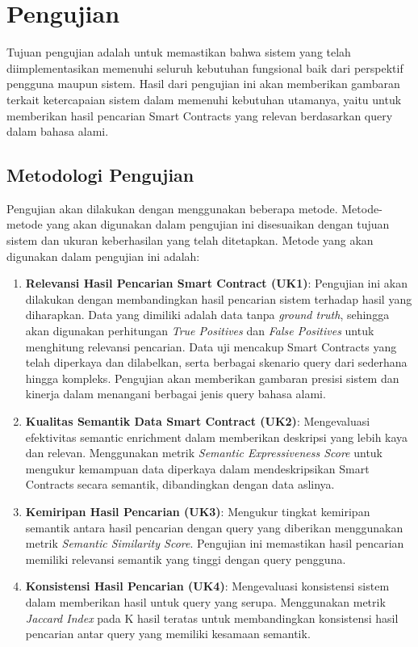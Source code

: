 \section{Pengujian}

Tujuan pengujian adalah untuk memastikan bahwa sistem yang telah diimplementasikan memenuhi seluruh kebutuhan fungsional baik dari perspektif pengguna maupun sistem. Hasil dari pengujian ini akan memberikan gambaran terkait ketercapaian sistem dalam memenuhi kebutuhan utamanya, yaitu untuk memberikan hasil pencarian Smart Contracts yang relevan berdasarkan query dalam bahasa alami.

\subsection{Metodologi Pengujian}

Pengujian akan dilakukan dengan menggunakan beberapa metode. Metode-metode yang akan digunakan dalam pengujian ini disesuaikan dengan tujuan sistem dan ukuran keberhasilan yang telah ditetapkan. Metode yang akan digunakan dalam pengujian ini adalah:

\begin{enumerate}
	\item \textbf{Relevansi Hasil Pencarian Smart Contract (UK1)}: Pengujian ini akan dilakukan dengan membandingkan hasil pencarian sistem terhadap hasil yang diharapkan. Data yang dimiliki adalah data tanpa \textit{ground truth}, sehingga akan digunakan perhitungan \textit{True Positives} dan \textit{False Positives} untuk menghitung relevansi pencarian. Data uji mencakup Smart Contracts yang telah diperkaya dan dilabelkan, serta berbagai skenario query dari sederhana hingga kompleks. Pengujian akan memberikan gambaran presisi sistem dan kinerja dalam menangani berbagai jenis query bahasa alami.
	\item \textbf{Kualitas Semantik Data Smart Contract (UK2)}: Mengevaluasi efektivitas semantic enrichment dalam memberikan deskripsi yang lebih kaya dan relevan. Menggunakan metrik \textit{Semantic Expressiveness Score} untuk mengukur kemampuan data diperkaya dalam mendeskripsikan Smart Contracts secara semantik, dibandingkan dengan data aslinya.
	\item \textbf{Kemiripan Hasil Pencarian (UK3)}: Mengukur tingkat kemiripan semantik antara hasil pencarian dengan query yang diberikan menggunakan metrik \textit{Semantic Similarity Score}. Pengujian ini memastikan hasil pencarian memiliki relevansi semantik yang tinggi dengan query pengguna.
	\item \textbf{Konsistensi Hasil Pencarian (UK4)}: Mengevaluasi konsistensi sistem dalam memberikan hasil untuk query yang serupa. Menggunakan metrik \textit{Jaccard Index} pada K hasil teratas untuk membandingkan konsistensi hasil pencarian antar query yang memiliki kesamaan semantik.
\end{enumerate}

